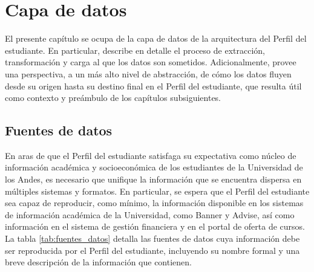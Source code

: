 \chapter{Capa de datos}

El presente capítulo se ocupa de la capa de datos de la arquitectura del Perfil del estudiante. En particular, describe en detalle el proceso de extracción, transformación y carga al que los datos son sometidos. Adicionalmente, provee una perspectiva, a un más alto nivel de abstracción, de cómo los datos fluyen desde su origen hasta su destino final en el Perfil del estudiante, que resulta útil como contexto y preámbulo de los capítulos subsiguientes.

\section{Fuentes de datos}

En aras de que el Perfil del estudiante satisfaga su expectativa como núcleo de información académica y socioeconómica de los estudiantes de la Universidad de los Andes, es necesario que unifique la información que se encuentra dispersa en múltiples sistemas y formatos. En particular, se espera que el Perfil del estudiante sea capaz de reproducir, como mínimo, la información disponible en los sistemas de información académica de la Universidad, como Banner y Advise, así como información en el sistema de gestión financiera y en el portal de oferta de cursos. La tabla \ref{tab:fuentes_datos} detalla las fuentes de datos cuya información debe ser reproducida por el Perfil del estudiante, incluyendo su nombre formal y una breve descripción de la información que contienen.

